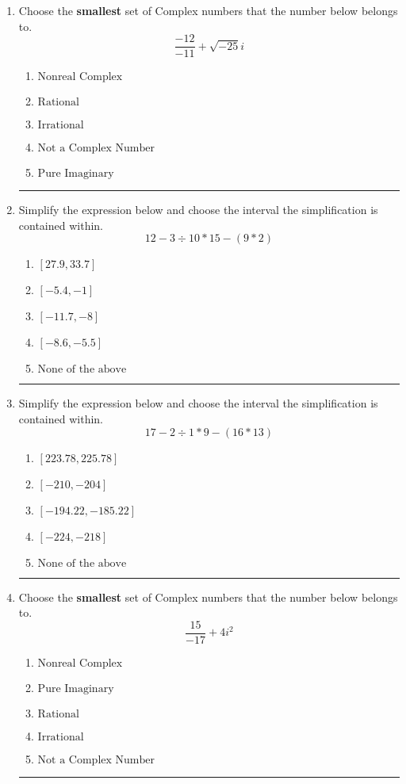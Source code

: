 \documentclass[14pt]{extbook}
\newcommand{\litem}[1]{\item#1\hspace*{-1cm}\rule{\textwidth}{0.4pt}}
\begin{document}
\begin{enumerate}
{\begin{enumerate}[label=\Alph*.]
\end{enumerate} }
\litem{
Choose the \textbf{smallest} set of Complex numbers that the number below belongs to.\[ \frac{-12}{-11}+\sqrt{-25}i \]\begin{enumerate}[label=\Alph*.]
\item \( \text{Nonreal Complex} \)
\item \( \text{Rational} \)
\item \( \text{Irrational} \)
\item \( \text{Not a Complex Number} \)
\item \( \text{Pure Imaginary} \)

\end{enumerate} }
\litem{
Simplify the expression below and choose the interval the simplification is contained within.\[ 12 - 3 \div 10 * 15 - (9 * 2) \]\begin{enumerate}[label=\Alph*.]
\item \( [27.9, 33.7] \)
\item \( [-5.4, -1] \)
\item \( [-11.7, -8] \)
\item \( [-8.6, -5.5] \)
\item \( \text{None of the above} \)

\end{enumerate} }
\litem{
Simplify the expression below and choose the interval the simplification is contained within.\[ 17 - 2 \div 1 * 9 - (16 * 13) \]\begin{enumerate}[label=\Alph*.]
\item \( [223.78, 225.78] \)
\item \( [-210, -204] \)
\item \( [-194.22, -185.22] \)
\item \( [-224, -218] \)
\item \( \text{None of the above} \)

\end{enumerate} }
\litem{
Choose the \textbf{smallest} set of Complex numbers that the number below belongs to.\[ \frac{15}{-17}+4i^2 \]\begin{enumerate}[label=\Alph*.]
\item \( \text{Nonreal Complex} \)
\item \( \text{Pure Imaginary} \)
\item \( \text{Rational} \)
\item \( \text{Irrational} \)
\item \( \text{Not a Complex Number} \)


\end{enumerate}}
\end{enumerate}
\end{document}
